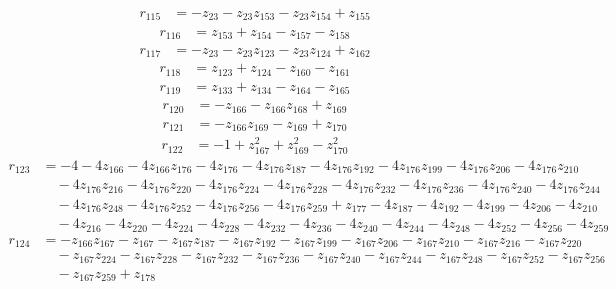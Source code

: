 \begin{align*}
r_{115} &= -z_{23} - z_{23}z_{153} - z_{23}z_{154} + z_{155}
\end{align*}
\begin{align*}
r_{116} &= z_{153} + z_{154} - z_{157} - z_{158}
\end{align*}
\begin{align*}
r_{117} &= -z_{23} - z_{23}z_{123} - z_{23}z_{124} + z_{162}
\end{align*}
\begin{align*}
r_{118} &= z_{123} + z_{124} - z_{160} - z_{161}
\end{align*}
\begin{align*}
r_{119} &= z_{133} + z_{134} - z_{164} - z_{165}
\end{align*}
\begin{align*}
r_{120} &= -z_{166} - z_{166}z_{168} + z_{169}
\end{align*}
\begin{align*}
r_{121} &= -z_{166}z_{169} - z_{169} + z_{170}
\end{align*}
\begin{align*}
r_{122} &= -1 + z_{167}^{2} + z_{169}^{2} - z_{170}^{2}
\end{align*}
\begin{align*}
r_{123} &= -4 - 4z_{166} - 4z_{166}z_{176} - 4z_{176} - 4z_{176}z_{187} - 4z_{176}z_{192} - 4z_{176}z_{199} - 4z_{176}z_{206} - 4z_{176}z_{210} \\
&\quad  - 4z_{176}z_{216} - 4z_{176}z_{220} - 4z_{176}z_{224} - 4z_{176}z_{228} - 4z_{176}z_{232} - 4z_{176}z_{236} - 4z_{176}z_{240} - 4z_{176}z_{244} \\
&\quad  - 4z_{176}z_{248} - 4z_{176}z_{252} - 4z_{176}z_{256} - 4z_{176}z_{259} + z_{177} - 4z_{187} - 4z_{192} - 4z_{199} - 4z_{206} - 4z_{210} \\
&\quad  - 4z_{216} - 4z_{220} - 4z_{224} - 4z_{228} - 4z_{232} - 4z_{236} - 4z_{240} - 4z_{244} - 4z_{248} - 4z_{252} - 4z_{256} - 4z_{259}
\end{align*}
\begin{align*}
r_{124} &= -z_{166}z_{167} - z_{167} - z_{167}z_{187} - z_{167}z_{192} - z_{167}z_{199} - z_{167}z_{206} - z_{167}z_{210} - z_{167}z_{216} - z_{167}z_{220} \\
&\quad  - z_{167}z_{224} - z_{167}z_{228} - z_{167}z_{232} - z_{167}z_{236} - z_{167}z_{240} - z_{167}z_{244} - z_{167}z_{248} - z_{167}z_{252} - z_{167}z_{256} \\
&\quad  - z_{167}z_{259} + z_{178}
\end{align*}
